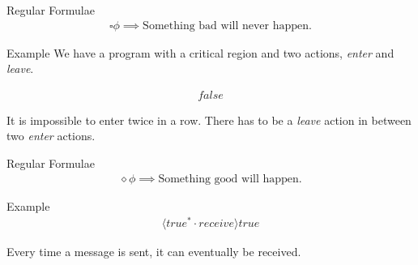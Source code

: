 \documentclass[aspectratio=1610]{beamer}
\begin{document}
  \begin{frame}{Regular Formulae}
    \begin{align*}
      \square\phi \implies \text{Something bad will never happen.}
    \end{align*}

    \begin{exampleblock}{Example}
      We have a program with a critical region and two actions, \textit{enter} and \textit{leave}.

      \begin{align*}
        [true^*\cdot enter \cdot \overline{leave}^* \cdot enter]false
      \end{align*}

      It is impossible to enter twice in a row. There has to be a \textit{leave} action in between two \textit{enter} actions.
    \end{exampleblock}
  \end{frame}

  \begin{frame}{Regular Formulae}
    \begin{align*}
      \diamond\phi \implies \text{Something good will happen.}
    \end{align*}

    \begin{exampleblock}{Example}
      \begin{align*}
        [true^*\cdot send]\langle true^* \cdot receive \rangle true
      \end{align*}

      Every time a message is sent, it can eventually be received.
    \end{exampleblock}
  \end{frame}
\end{document}
